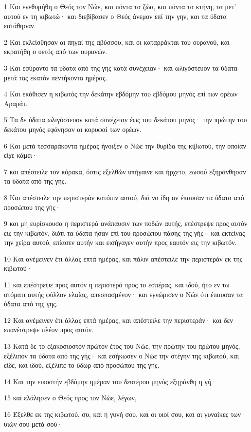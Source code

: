 \par 1 Και ενεθυμήθη ο Θεός τον Νώε, και πάντα τα ζώα, και πάντα τα κτήνη, τα μετ' αυτού εν τη κιβωτώ· και διεβίβασεν ο Θεός άνεμον επί την γην, και τα ύδατα εστάθησαν.
\par 2 Και εκλείσθησαν αι πηγαί της αβύσσου, και οι καταρράκται του ουρανού, και εκρατήθη ο υετός από των ουρανών.
\par 3 Και εσύροντο τα ύδατα από της γης κατά συνέχειαν· και ωλιγόστευον τα ύδατα μετά τας εκατόν πεντήκοντα ημέρας.
\par 4 Και εκάθισεν η κιβωτός την δεκάτην εβδόμην του εβδόμου μηνός επί των ορέων Αραράτ.
\par 5 Τα δε ύδατα ωλιγόστευον κατά συνέχειαν έως του δεκάτου μηνός· την πρώτην του δεκάτου μηνός εφάνησαν αι κορυφαί των ορέων.
\par 6 Και μετά τεσσαράκοντα ημέρας ήνοιξεν ο Νώε την θυρίδα της κιβωτού, την οποίαν είχε κάμει·
\par 7 και απέστειλε τον κόρακα, όστις εξελθών υπήγαινε και ήρχετο, εωσού εξηράνθησαν τα ύδατα από της γης.
\par 8 Και απέστειλε την περιστεράν κατόπιν αυτού, διά να ίδη αν έπαυσαν τα ύδατα από προσώπου της γής·
\par 9 και μη ευρίσκουσα η περιστερά ανάπαυσιν των ποδών αυτής, επέστρεψε προς αυτόν εις την κιβωτόν, διότι τα ύδατα ήσαν επί του προσώπου πάσης της γής· και εκτείνας την χείρα αυτού, επίασεν αυτήν και εισήγαγεν αυτήν προς εαυτόν εις την κιβωτόν.
\par 10 Και ανέμεινεν έτι άλλας επτά ημέρας, και πάλιν απέστειλε την περιστεράν εκ της κιβωτού·
\par 11 και επέστρεψε προς αυτόν η περιστερά προς το εσπέρας, και ιδού, ήτο εν τω στόματι αυτής φύλλον ελαίας, απεσπασμένον· και εγνώρισεν ο Νώε ότι έπαυσαν τα ύδατα από της γης.
\par 12 Και ανέμεινεν έτι άλλας επτά ημέρας, και απέστειλε την περιστεράν· και δεν επανέστρεψε πλέον προς αυτόν.
\par 13 Κατά δε το εξακοσιοστόν πρώτον έτος του Νώε, την πρώτην του πρώτου μηνός, εξέλιπον τα ύδατα από της γής· και εσήκωσεν ο Νώε την στέγην της κιβωτού, και είδε, και ιδού, εξέλιπε το ύδωρ από προσώπου της γης.
\par 14 Και την εικοστήν εβδόμην ημέραν του δευτέρου μηνός εξηράνθη η γή·
\par 15 και ελάλησεν ο Θεός προς τον Νώε, λέγων,
\par 16 Έξελθε εκ της κιβωτού, συ, και η γυνή σου, και οι υιοί σου, και αι γυναίκες των υιών σου μετά σού·
